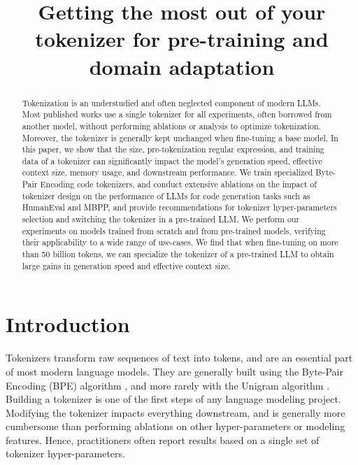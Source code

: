 \title{Getting the most out of your tokenizer for pre-training and domain adaptation}

\begin{abstract}
Tokenization is an understudied and often neglected component of modern LLMs. Most published works use a single tokenizer for all experiments, often borrowed from another model, without performing ablations or analysis to optimize tokenization. Moreover, the tokenizer is generally kept unchanged when fine-tuning a base model. In this paper, we show that the size, pre-tokenization regular expression, and training data of a tokenizer can significantly impact the model's generation speed, effective context size, memory usage, and downstream performance. We train specialized Byte-Pair Encoding code tokenizers, and conduct extensive ablations on the impact of tokenizer design on the performance of LLMs for code generation tasks such as HumanEval and MBPP, and provide recommendations for tokenizer hyper-parameters selection and switching the tokenizer in a pre-trained LLM. We perform our experiments on models trained from scratch and from pre-trained models, verifying their applicability to a wide range of use-cases. We find that when fine-tuning on more than 50 billion tokens, we can specialize the tokenizer of a pre-trained LLM to obtain large gains in generation speed and effective context size.
\end{abstract}

\section{Introduction}

Tokenizers transform raw sequences of text into tokens, and are an essential part of most modern language models. They are generally built using the Byte-Pair Encoding (BPE) algorithm \citep{sennrich-etal-2016-neural}, and more rarely with the Unigram algorithm \cite{Kudo_2018}. Building a tokenizer is one of the first steps of any language modeling project. Modifying the tokenizer impacts everything downstream, and is generally more cumbersome than performing ablations on other hyper-parameters or modeling features. Hence, practitioners often report results based on a single set of tokenizer hyper-parameters.

